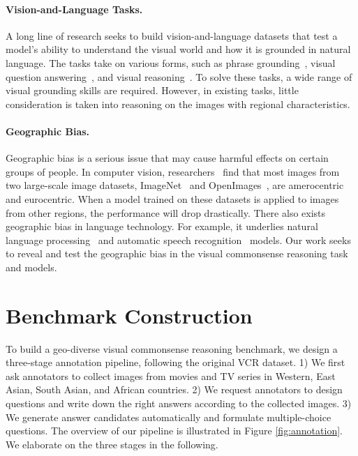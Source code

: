 \documentclass[11pt]{article}
\begin{document}
\paragraph{Vision-and-Language Tasks.}
A long line of research seeks to build vision-and-language datasets that test a model's ability to understand the visual world and how it is grounded in natural language. The tasks take on various forms, such as phrase grounding~\cite{kazemzadeh-etal-2014-referitgame,plummer2015flickr30k}, visual question answering~\cite{antol2015vqa,balanced_vqa_v2}, and visual reasoning~\cite{zellers2019vcr,suhr-etal-2019-corpus}.
To solve these tasks, a wide range of visual grounding skills are required.  
However, in existing tasks, little consideration is taken into reasoning on the images with regional characteristics. 

\paragraph{Geographic Bias.}
Geographic bias is a serious issue that may cause harmful effects on certain groups of people. In computer vision, researchers~\cite{shankar2017no,de2019does} find that most images from two large-scale image datasets, ImageNet~\cite{imagenet_cvpr09} and OpenImages~\cite{openimages}, are amerocentric and eurocentric. When a model trained on these datasets is applied to images from other regions, the performance will drop drastically. There also exists geographic bias in language technology. For example, it underlies natural language processing~\cite{blodgett-etal-2016-demographic,jurgens-etal-2017-incorporating,ghosh2021cross} and automatic speech recognition~\cite{tatman-2017-gender,koenecke2020racial} models. Our work seeks to reveal and test the geographic bias in the visual commonsense reasoning task and models.

\section{Benchmark Construction}
To build a geo-diverse visual commonsense reasoning benchmark, we design a three-stage annotation pipeline, following the original VCR dataset. 1) We first ask annotators to collect images from movies and TV series in Western, East Asian, South Asian, and African countries. 2) We request annotators to design questions and write down the right answers according to the collected images. 3) We generate answer candidates automatically and formulate multiple-choice questions. The overview of our pipeline is illustrated in Figure \ref{fig:annotation}. We elaborate on the three stages in the following.
\end{document}

